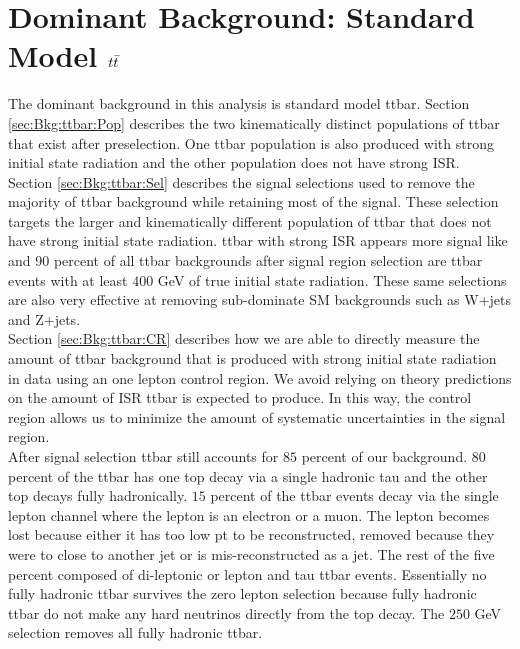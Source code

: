 \section{Dominant Background: Standard Model $t\bar{t}$}
\label{sec:Bkg:ttbar}

\indent The dominant background in this analysis is standard model ttbar.  Section \ref{sec:Bkg:ttbar:Pop} describes the two kinematically distinct populations of ttbar that exist after preselection.  One ttbar population is also produced with strong initial state radiation and the other population does not have strong ISR.  \\
\indent Section \ref{sec:Bkg:ttbar:Sel} describes the signal selections used to remove the majority of ttbar background while retaining most of the signal.  These selection targets the larger and kinematically different population of ttbar that does not have strong initial state radiation.  ttbar with strong ISR appears more signal like and 90 percent of all ttbar backgrounds after signal region selection are ttbar events with at least $400$ GeV of true initial state radiation.  These same selections are also very effective at removing sub-dominate SM backgrounds such as W+jets and Z+jets. \\
\indent Section \ref{sec:Bkg:ttbar:CR} describes how we are able to directly measure the amount of ttbar background that is produced with strong initial state radiation in data using an one lepton control region.  We avoid relying on theory predictions on the amount of ISR ttbar is expected to produce.  In this way, the control region allows us to minimize the amount of systematic uncertainties in the signal region. \\
\indent After signal selection ttbar still accounts for $85$ percent of our background. 80 percent of the ttbar has one top decay via a single hadronic tau and the other top decays fully hadronically.  $15$ percent of the ttbar events decay via the single lepton channel where the lepton is an electron or a muon.  The lepton becomes lost because either it has too low pt to be reconstructed, removed because they were to close to another jet or is mis-reconstructed as a jet. The rest of the five percent composed of di-leptonic or lepton and tau ttbar events. Essentially no fully hadronic ttbar survives the zero lepton selection because fully hadronic ttbar do not make any hard neutrinos directly from the top decay.  The $250$ GeV \MET selection removes all fully hadronic ttbar.  \\

